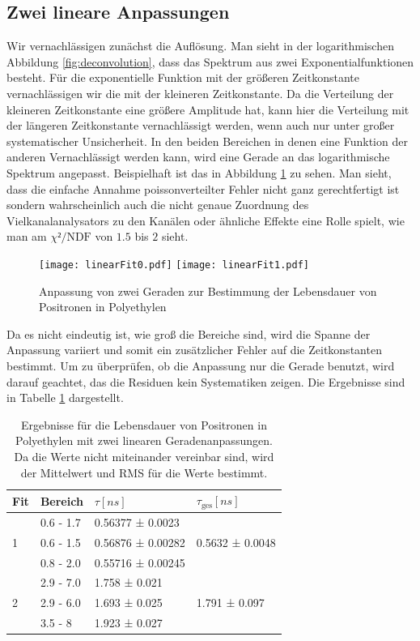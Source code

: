 \documentclass[a4paper,12pt]{article}
\begin{document}
\subsection{Zwei lineare Anpassungen}
Wir vernachlässigen zunächst die Auflösung.
Man sieht in der logarithmischen Abbildung \ref{fig:deconvolution}, dass das Spektrum aus zwei Exponentialfunktionen
besteht. Für die exponentielle Funktion mit der größeren Zeitkonstante vernachlässigen wir die mit
der kleineren Zeitkonstante. Da die Verteilung der kleineren Zeitkonstante eine größere Amplitude
hat, kann hier die Verteilung mit der längeren Zeitkonstante vernachlässigt werden, wenn auch nur
unter großer systematischer Unsicherheit. In den beiden Bereichen in denen eine Funktion der anderen
Vernachlässigt werden kann, wird eine Gerade an das logarithmische Spektrum angepasst. Beispielhaft
ist das in Abbildung \ref{fig:dualLinearFit} zu sehen. Man sieht, dass die einfache Annahme
poissonverteilter Fehler nicht ganz gerechtfertigt ist sondern wahrscheinlich auch die nicht genaue
Zuordnung des Vielkanalanalysators zu den Kanälen oder ähnliche Effekte eine Rolle spielt, wie man
am $χ²/\text{NDF}$ von $1.5$ bis $2$ sieht.
\begin{figure}
	\texttt{[image: linearFit0.pdf]}
	\texttt{[image: linearFit1.pdf]}
	\caption{Anpassung von zwei Geraden zur Bestimmung der Lebensdauer von Positronen in Polyethylen}
	\label{fig:dualLinearFit}
\end{figure}

Da es nicht eindeutig ist, wie groß die Bereiche sind, wird die Spanne der
Anpassung variiert und somit ein zusätzlicher Fehler auf die Zeitkonstanten bestimmt.
Um zu überprüfen, ob die Anpassung nur die Gerade benutzt, wird darauf geachtet, das die Residuen
kein Systematiken zeigen.
Die Ergebnisse sind in Tabelle \ref{tab:linearPoly} dargestellt.

\begin{table}[h]
	\begin{tabular}{l |l l ||l}
			Fit& Bereich & $τ [\si{ns}]$ & $τ_\text{ges} [\si{ns}]$ \\
		\hline
		\multirow{3}{*}{1} &0.6 - 1.7&  0.56377 ± 0.0023  &\multirow{3}{*}{0.5632 ± 0.0048}\\
			 &0.6 - 1.5&  0.56876 ± 0.00282 &\\
			 &0.8 - 2.0&  0.55716 ± 0.00245 &\\
		\hline
		\multirow{3}{*}{2} & 2.9 - 7.0 &  1.758 ± 0.021 &\multirow{3}{*}{1.791 ± 0.097}\\
			&2.9 - 6.0&  1.693 ± 0.025 & \\
			&3.5 - 8&  1.923 ± 0.027  &
	\end{tabular}
	\centering
	\caption{Ergebnisse für die Lebensdauer von Positronen in Polyethylen mit zwei linearen
		Geradenanpassungen. Da die Werte nicht miteinander vereinbar sind, wird der Mittelwert und
	RMS für die Werte bestimmt.}
	\label{tab:linearPoly}
\end{table}
\end{document}
